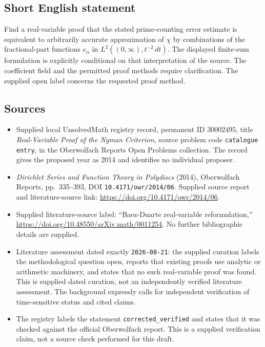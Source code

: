 \documentclass[11pt]{article}
\begin{document}
\subsection{Short English statement}
Find a real-variable proof that the stated prime-counting error estimate is equivalent to arbitrarily accurate approximation of \(\chi\) by combinations of the fractional-part functions \(e_\alpha\) in \(L^2((0,\infty),t^{-2}\,dt)\). The displayed finite-sum formulation is explicitly conditional on that interpretation of the source. The coefficient field and the permitted proof methods require clarification. The supplied open label concerns the requested proof method.
\subsection{Sources}
\begin{itemize}
\item Supplied local UnsolvedMath registry record, permanent ID \(30002495\), title \emph{Real-Variable Proof of the Nyman Criterion}, source problem code \texttt{catalogue entry}, in the Oberwolfach Reports Open Problems collection. The record gives the proposed year as 2014 and identifies no individual proposer.
\item \emph{Dirichlet Series and Function Theory in Polydiscs} (2014), Oberwolfach Reports, pp.\ 335--393, DOI \texttt{10.4171/owr/2014/06}. Supplied source report and literature-source link: \url{https://doi.org/10.4171/owr/2014/06}.
\item Supplied literature-source label: ``Baez-Duarte real-variable reformulation,'' \url{https://doi.org/10.48550/arXiv.math/0011254}. No further bibliographic details are supplied.
\item Literature assessment dated exactly \texttt{2026-08-21}: the supplied curation labels the methodological question open, reports that existing proofs use analytic or arithmetic machinery, and states that no such real-variable proof was found. This is supplied dated curation, not an independently verified literature assessment. The background expressly calls for independent verification of time-sensitive status and cited claims.
\item The registry labels the statement \texttt{corrected\_verified} and states that it was checked against the official Oberwolfach report. This is a supplied verification claim, not a source check performed for this draft.
\end{itemize}
\end{document}
